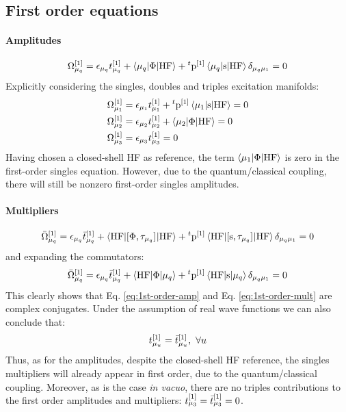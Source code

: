 \subsection{First order equations}\label{sec:first-order-pt}

\paragraph*{Amplitudes}
\begin{equation}\label{eq:1st-order-amp}
  \Omega_{\mu_q}^{[1]} = \epsilon_{\mu_q}t_{\mu_q}^{[1]}
  + \braket{\mu_q | \Phi | \mathrm{HF}}
  + {}^t\mathrm{p}^{[1]}\braket{\mu_q | \mathrm{s} | \mathrm{HF}}\delta_{\mu_q\mu_1}
  = 0
\end{equation}
Explicitly considering the singles, doubles and triples excitation manifolds:
\begin{subequations}
  \begin{align}
  \Omega_{\mu_1}^{[1]} &= \epsilon_{\mu_1}t_{\mu_1}^{[1]}
  + {}^t\mathrm{p}^{[1]}\braket{\mu_1 | \mathrm{s} | \mathrm{HF}}
  = 0 \\
  \Omega_{\mu_2}^{[1]} &= \epsilon_{\mu_2}t_{\mu_2}^{[1]}
  + \braket{\mu_2 | \Phi | \mathrm{HF}}
  = 0 \\
  \Omega_{\mu_3}^{[1]} &= \epsilon_{\mu_3}t_{\mu_3}^{[1]} = 0
  \end{align}
\end{subequations}
Having chosen a closed-shell \acrshort{HF} as reference,
the term $\braket{\mu_1 | \Phi | \mathrm{HF}}$ is zero in the
first-order singles equation. However, due to the quantum/classical
coupling, there will still be nonzero first-order singles amplitudes.

\paragraph*{Multipliers}
\begin{equation}%
  \bar{\Omega}_{\mu_q}^{[1]} =
    \denom{\mu_q}\tbar{\mu_q}^{[1]}
    + \braket{\mathrm{HF} | \commutator{\Phi}{\cluster{\mu_q}} | \mathrm{HF}}
    + {}^t\p^{[1]}\braket{\mathrm{HF} |
    \commutator{\s}{\cluster{\mu_q}} | \mathrm{HF}}\delta_{\mu_q\mu_1} =0
\end{equation}
and expanding the commutators:
\begin{equation}\label{eq:1st-order-mult}
  \bar{\Omega}_{\mu_q}^{[1]} =
    \epsilon_{\mu_q}\bar{t}_{\mu_q}^{[1]}
    + \braket{\mathrm{HF} | \Phi | \mu_q}
    + {}^t\mathrm{p}^{[1]}\braket{\mathrm{HF} | \mathrm{s} | \mu_q}\delta_{\mu_q\mu_1} =0
\end{equation}
This clearly shows that Eq. \eqref{eq:1st-order-amp}
and Eq. \eqref{eq:1st-order-mult} are complex conjugates. Under the
assumption of real wave functions we can also conclude that:
\begin{equation}
  t_{\mu_u}^{[1]} = \bar{t}_{\mu_u}^{[1]},\,\,\forall u
\end{equation}
Thus, as for the amplitudes, despite the closed-shell \acrshort{HF} reference, the singles
multipliers will already appear in first order, due to the
quantum/classical coupling.
Moreover, as is the case \emph{in vacuo}, there are no triples contributions to
the first order amplitudes and multipliers: $t_{\mu_3}^{[1]} = \bar{t}_{\mu_3}^{[1]} = 0$.

